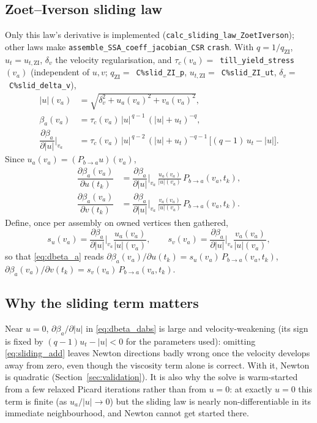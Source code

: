 \documentclass[11pt]{article}
\newcommand{\code}[1]{\texttt{#1}}
\newcommand{\tk}{t_k}
\newcommand{\va}{v_a}
\newcommand{\pd}[2]{\dfrac{\partial #1}{\partial #2}}
\begin{document}
\subsection{Zoet--Iverson sliding law}

Only this law's derivative is implemented
(\code{calc\_\allowbreak sliding\_\allowbreak law\_\allowbreak ZoetIverson}); other laws make
\code{assemble\_\allowbreak SSA\_\allowbreak coeff\_\allowbreak jacobian\_\allowbreak CSR} \code{crash}. With
$q = 1/q_{\mathrm{ZI}}$, $u_t = u_{t,\mathrm{ZI}}$, $\delta_v$ the velocity
regularisation, and $\tau_c(\va) = $~\code{till\_\allowbreak yield\_\allowbreak stress}$(\va)$
(independent of $u,v$; $q_{\mathrm{ZI}}=$~\code{C\%slid\_\allowbreak ZI\_\allowbreak p},
$u_{t,\mathrm{ZI}}=$~\code{C\%slid\_\allowbreak ZI\_\allowbreak ut},
$\delta_v=$~\code{C\%slid\_\allowbreak delta\_\allowbreak v}),
\begin{align}
|u|(\va) &= \sqrt{\delta_v^2 + u_a(\va)^2 + v_a(\va)^2}, \\
\beta_a(\va) &= \tau_c(\va)\,|u|^{\,q-1}\,(|u|+u_t)^{-q}, \\
\pd{\beta_a}{|u|}\bigg|_{\va} &= \tau_c(\va)\,|u|^{\,q-2}\,(|u|+u_t)^{-q-1}\,
  \Big[(q-1)\,u_t - |u|\Big]. \label{eq:dbeta_dabs}
\end{align}
Since $u_a(\va) = (P_{b\to a}u)(\va)$,
\begin{align}
\pd{\beta_a(\va)}{u(\tk)} &= \pd{\beta_a}{|u|}\bigg|_{\va}\,\frac{u_a(\va)}{|u|(\va)}\,P_{b\to a}(\va,\tk), \label{eq:dbeta_a}\\
\pd{\beta_a(\va)}{v(\tk)} &= \pd{\beta_a}{|u|}\bigg|_{\va}\,\frac{v_a(\va)}{|u|(\va)}\,P_{b\to a}(\va,\tk).
\end{align}
Define, once per assembly on owned vertices then gathered,
\begin{equation}
s_u(\va) = \pd{\beta_a}{|u|}\bigg|_{\va}\frac{u_a(\va)}{|u|(\va)}, \qquad
s_v(\va) = \pd{\beta_a}{|u|}\bigg|_{\va}\frac{v_a(\va)}{|u|(\va)},
\end{equation}
so that \eqref{eq:dbeta_a} reads $\partial\beta_a(\va)/\partial u(\tk) =
s_u(\va)\,P_{b\to a}(\va,\tk)$, $\partial\beta_a(\va)/\partial v(\tk) =
s_v(\va)\,P_{b\to a}(\va,\tk)$.

\subsection{Why the sliding term matters}

Near $u=0$, $\partial\beta_a/\partial|u|$ in \eqref{eq:dbeta_dabs} is large and
velocity-weakening (its sign is fixed by $(q-1)u_t - |u| < 0$ for the
parameters used): omitting \eqref{eq:sliding_add} leaves Newton directions
badly wrong once the velocity develops away from zero, even though the
viscosity term alone is correct. With it, Newton is quadratic
(Section~\ref{sec:validation}). It is also why the solve is warm-started from
a few relaxed Picard iterations rather than from $u=0$: at exactly $u=0$ this
term is finite (as $u_a/|u|\to0$) but the sliding law is nearly
non-differentiable in its immediate neighbourhood, and Newton cannot get
started there.
\end{document}
